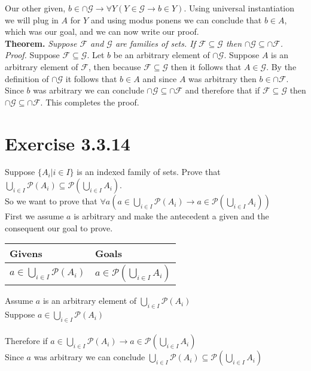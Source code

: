 \documentclass{article}
\newcommand{\n}{ \noindent }
\newcommand{\F}{\mathcal{F}}
\newcommand{\G}{\mathcal{G}}
\newcommand{\pwset}{\mathscr{P}}
\begin{document}
\n Our other given, $b \in \cap \G \rightarrow \forall Y (Y \in \G \rightarrow b \in Y)$. Using universal instantiation we will plug in $A$ for $Y$ and using modus ponens we can conclude that $b \in A$, which was our goal, and we can now write our proof. \\


\n \textbf{Theorem.} \textit{Suppose $\F$ and $\G$ are families of sets. If $\F \subseteq \G$ then 
$\cap \G \subseteq \cap \F$.}
\n \textit{Proof.} Suppose $\F \subseteq \G$. Let $b$ be an arbitrary element of $\cap \G$. Suppose $A$ is an arbitrary element of $\F$, then because $\F \subseteq \G$ then it follows that $A \in \G$. By the definition of $\cap \G$ it follows that $b \in A$ and since $A$ was arbitrary then $b \in \cap \F$. Since $b$ was arbitrary we can conclude $\cap \G \subseteq \cap \F$ and therefore that if $\F \subseteq \G$ then $\cap \G \subseteq \cap \F$. This completes the proof.



\section{Exercise 3.3.14}

Suppose $\{ A_{i} | i \in I \} $ is an indexed family of sets. Prove that $\bigcup_{i \in I} \pwset(A_{i}) \subseteq \pwset (\bigcup_{i \in I} A_{i})$. \\

\n So we want to prove that $\forall a (a \in \bigcup_{i \in I} \pwset(A_{i}) \rightarrow a \in \pwset(\bigcup_{i \in I} A_i))$ \\

\n First we assume $a$ is arbitrary and make the antecedent a given and the consequent our goal to prove. \\

\begin{table}[h]
\begin{tabular}{ll}
\hline
Givens & Goals   \\ \hline
$a \in \bigcup_{i \in I} \pwset(A_{i})$ & $a \in \pwset(\bigcup_{i \in I} A_i)$   \\ \hline
\end{tabular}
\end{table}


\n Assume $a$ is an arbitrary element of $\bigcup_{i \in I} \pwset(A_{i})$ \\
\indent Suppose $a \in \bigcup_{i \in I} \pwset(A_{i})$ \\
\indent \indent [ proof of $a \in \pwset(\bigcup_{i \in I} A_i)$ ] \\
\indent Therefore if $a \in \bigcup_{i \in I} \pwset(A_{i}) \rightarrow a \in \pwset(\bigcup_{i \in I} A_i)$ \\
\n Since $a$ was arbitrary we can conclude $\bigcup_{i \in I} \pwset(A_{i}) \subseteq \pwset (\bigcup_{i \in I} A_{i})$ \\
\end{document}

